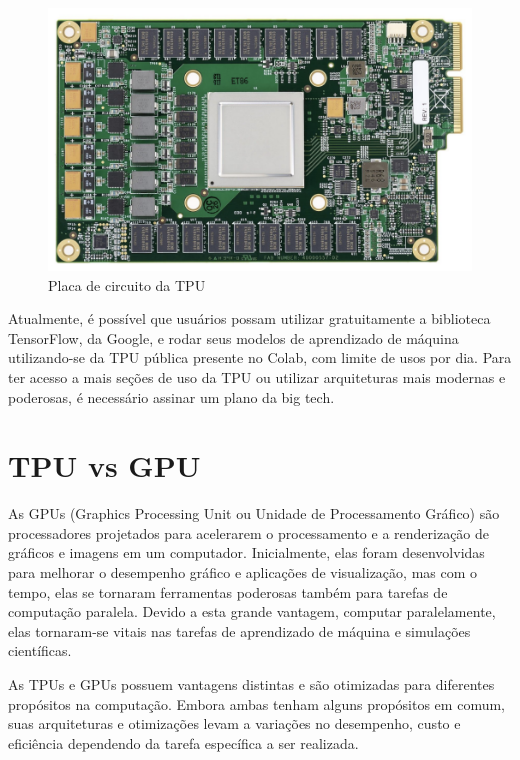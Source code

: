 \documentclass{report}
\begin{document}
\begin{figure}[h]
	\includegraphics[scale=0.7]{circuit-board}
	\centering
	\caption{Placa de circuito da TPU}
\end{figure}

Atualmente, é possível que usuários possam utilizar gratuitamente a biblioteca TensorFlow, da Google, e rodar seus modelos de aprendizado de máquina utilizando-se da TPU pública presente no Colab, com limite de usos por dia. Para ter acesso a mais seções de uso da TPU ou utilizar arquiteturas mais modernas e poderosas, é necessário assinar um plano da big tech.

\chapter{TPU vs GPU}

\setlength{\parskip}{1em}\hspace{0.5cm} As GPUs (Graphics Processing Unit ou Unidade de Processamento Gráfico) são processadores projetados para acelerarem o processamento e a renderização de gráficos e imagens em um computador. Inicialmente, elas foram desenvolvidas para melhorar o desempenho gráfico e aplicações de visualização, mas com o tempo, elas se tornaram ferramentas poderosas também para tarefas de computação paralela. Devido a esta grande vantagem, computar paralelamente, elas tornaram-se vitais nas tarefas de aprendizado de máquina e simulações científicas.

As TPUs e GPUs possuem vantagens distintas e são otimizadas para diferentes propósitos na computação. Embora ambas tenham alguns propósitos em comum, suas arquiteturas e otimizações levam a variações no desempenho, custo e eficiência dependendo da tarefa específica a ser realizada.
\end{document}
